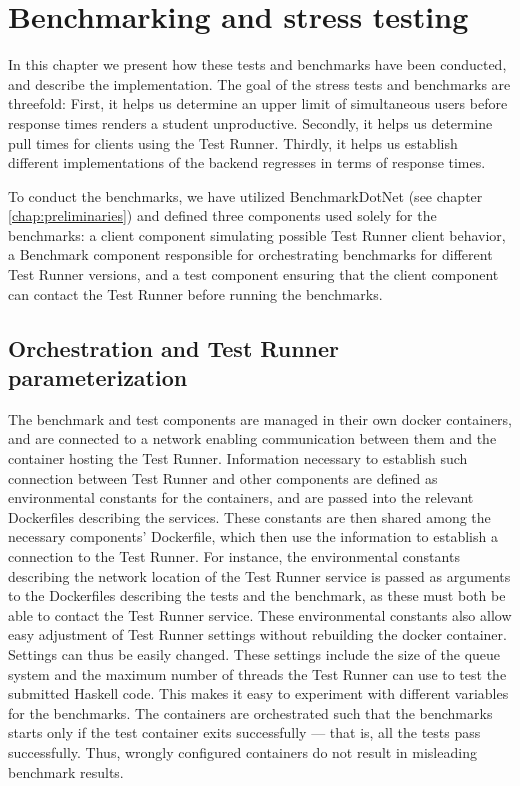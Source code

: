 \section{Benchmarking and stress testing} \label{chap:Benchmarking}
In this chapter we present how these tests and benchmarks have been conducted, and describe the implementation. 
The goal of the stress tests and benchmarks are threefold: 
First, it helps us determine an upper limit of simultaneous users before response times renders a student unproductive.
Secondly, it helps us determine pull times for clients using the Test Runner.
Thirdly, it helps us establish different implementations of the backend regresses in terms of response times.

To conduct the benchmarks, we have utilized BenchmarkDotNet (see chapter \ref{chap:preliminaries}) and defined three components used solely for the benchmarks:
a client component simulating possible Test Runner client behavior, a Benchmark component responsible for orchestrating benchmarks for different Test Runner versions, and a test component ensuring that the client component can contact the Test Runner before running the benchmarks.

\subsection{Orchestration and Test Runner parameterization}
The benchmark and test components are managed in their own docker containers, and are connected to a network enabling communication between them and the container hosting the Test Runner. 
Information necessary to establish such connection between Test Runner and other components are defined as environmental constants for the containers, and are passed into the relevant Dockerfiles describing the services.
These constants are then shared among the necessary components' Dockerfile, which then use the information to establish a connection to the Test Runner.
For instance, the environmental constants describing the network location of the Test Runner service is passed as arguments to the Dockerfiles describing the tests and the benchmark, as these must both be able to contact the Test Runner service.
These environmental constants also allow easy adjustment of Test Runner settings without rebuilding the docker container.
Settings can thus be easily changed.
These settings include the size of the queue system and the maximum number of threads the Test Runner can use to test the submitted Haskell code.
This makes it easy to experiment with different variables for the benchmarks.  
The containers are orchestrated such that the benchmarks starts only if the test container exits successfully --- that is, all the tests pass successfully. 
Thus, wrongly configured containers do not result in misleading benchmark results.

